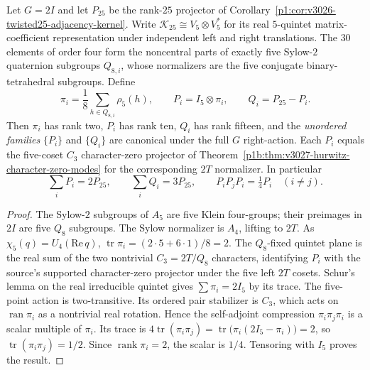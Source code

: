 \documentclass[11pt]{article}
\begin{document}
\begin{theorem}
\label{p1b:thm:unmarked-five-sylow-projectors}
Let $G=2I$ and let $P_{25}$ be the rank-$25$ projector of
Corollary~\ref{p1:cor:v3026-twisted25-adjacency-kernel}.  Write
$\mathcal K_{25}\cong V_5\otimes V_5^*$ for its real $5$-quintet
matrix-coefficient representation under independent left and right
translations.  The $30$ elements of order four form the noncentral
parts of exactly five Sylow-$2$ quaternion subgroups $Q_{8,i}$, whose
normalizers are the five conjugate binary-tetrahedral subgroups.
Define
\[
  \pi_i=\frac18\sum_{h\in Q_{8,i}}\rho_5(h),\qquad
  P_i=I_5\otimes\pi_i,\qquad Q_i=P_{25}-P_i.
\]
Then $\pi_i$ has rank two, $P_i$ has rank ten, $Q_i$ has rank fifteen,
and the \emph{unordered families} $\{P_i\}$ and $\{Q_i\}$ are
canonical under the full $G$ right-action.  Each $P_i$ equals the
five-coset $C_3$ character-zero projector of
Theorem~\ref{p1b:thm:v3027-hurwitz-character-zero-modes} for the
corresponding $2T$ normalizer.  In particular
\[
   \sum_iP_i=2P_{25},\qquad \sum_iQ_i=3P_{25},\qquad
   P_iP_jP_i=\tfrac14P_i\quad(i\ne j).
\]
\end{theorem}
\begin{proof}
The Sylow-$2$ subgroups of $A_5$ are five Klein four-groups; their
preimages in $2I$ are five $Q_8$ subgroups.  The Sylow normalizer is
$A_4$, lifting to $2T$.  As $\chi_5(q)=U_4(\mathrm{Re}\,q)$,
\(\operatorname{tr}\pi_i=(2\cdot5+6\cdot1)/8=2\).
The $Q_8$-fixed quintet plane is the real sum of the two nontrivial
$C_3=2T/Q_8$ characters, identifying $P_i$ with the source's supported
character-zero projector under the five left $2T$ cosets.
Schur's lemma on the real irreducible quintet gives
$\sum\pi_i=2I_5$ by its trace.
The five-point action is two-transitive.  Its ordered pair stabilizer
is $C_3$, which acts on $\operatorname{ran}\pi_i$ as a nontrivial real
rotation.  Hence the self-adjoint compression $\pi_i\pi_j\pi_i$ is a
scalar multiple of $\pi_i$.  Its trace is
$4\operatorname{tr}(\pi_i\pi_j)=\operatorname{tr}\bigl(\pi_i(2I_5-\pi_i)\bigr)=2$,
so $\operatorname{tr}(\pi_i\pi_j)=1/2$.  Since $\operatorname{rank}\pi_i=2$,
the scalar is $1/4$.  Tensoring with $I_5$ proves the result.
\end{proof}
\end{document}
